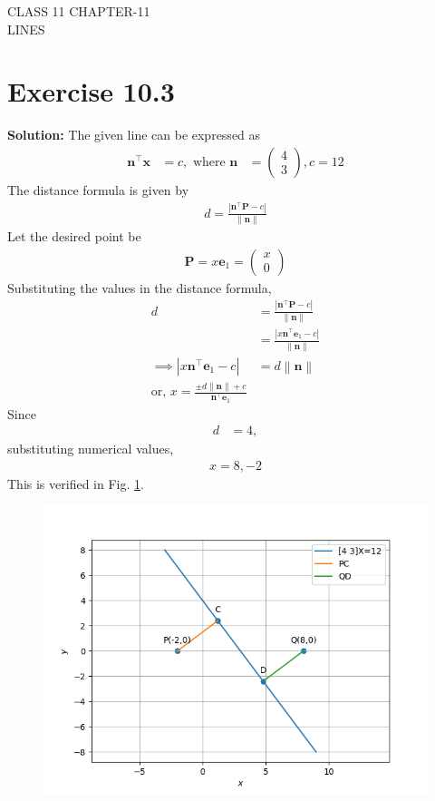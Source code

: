 \documentclass[12pt]{article}
\providecommand{\norm}[1]{\left\lVert#1\right\rVert}
\newcommand{\solution}{\noindent \textbf{Solution: }}
\newcommand{\myvec}[1]{\ensuremath{\begin{pmatrix}#1\end{pmatrix}}}
\providecommand{\abs}[1]{\left\vert#1\right\vert}
\let\vec\mathbf
\begin{document}
\begin{center}
\textbf\large{CLASS 11 CHAPTER-11 \\ LINES}

\end{center}
\section*{Exercise 10.3}


\solution
\fi
The given line can be expressed as 
\begin{align}
	\vec{n}^{\top}\vec{x}&=c,
	\text{ where }
		\vec{n} &= \myvec{4\\3} , c = 12
\end{align}
The distance formula is given by
\begin{align}
	d = \frac{\abs{\vec{n}^\top\vec{P}-c}}{\norm{\vec{n}}}
\end{align}
Let the desired point be
\begin{align}
	\vec{P} = x\vec{e}_{1} = \myvec{x\\0}
\end{align}
Substituting the values in the distance formula, 
\begin{align}
	d &= \frac{\abs{\vec{n}^\top\vec{P}-c}}{\norm{\vec{n}}}\\
	  &= \frac{\abs{x\vec{n}^\top\vec{e}_{1}-c}}{\norm{\vec{n}}}
	  \\
	  \implies 
	\abs{x\vec{n}^\top\vec{e}_{1}-c} &= d\norm{\vec{n}}
	\\
	\text{or, }	x = \frac{\pm d\norm{\vec{n}}+c}{\vec{n}^\top\vec{e}_{1}}
\end{align}
Since 
\begin{align}
	d &= 4,
\end{align}
substituting numerical values, 
\begin{align}
	x = 8,
	 -2
\end{align}
This is verified in Fig. 
\ref{fig:11/10/3/5/Fig1}.	
\begin{figure}[!h]
	\begin{center} 
	    \includegraphics[width=\columnwidth]{chapters/11/10/3/5/figs/line2}
	\end{center}
\caption{}
\label{fig:11/10/3/5/Fig1}
\end{figure}
\end{document}
